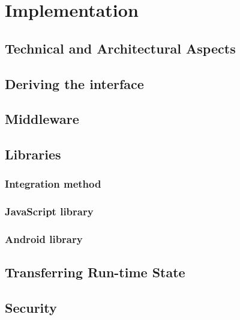 \chapter{Implementation}
\label{ch:implementation}


\section{Technical and Architectural Aspects}
\section{Deriving the interface}
\section{Middleware}
\section{Libraries}
\subsection{Integration method}
\subsection{JavaScript library}
\subsection{Android library}
\section{Transferring Run-time State}
\section{Security}